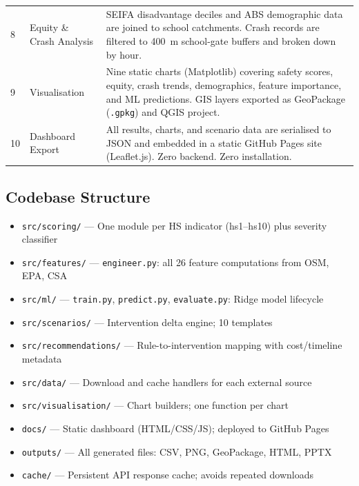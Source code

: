 \documentclass[11pt,a4paper]{article}
\begin{document}
\begin{tabularx}{\linewidth}{C{0.5cm} L{3.2cm} L{9.5cm}}
8 & Equity \& Crash Analysis & SEIFA disadvantage deciles and ABS demographic data are joined to school catchments. Crash records are filtered to 400~m school-gate buffers and broken down by hour. \\
9 & Visualisation       & Nine static charts (Matplotlib) covering safety scores, equity, crash trends, demographics, feature importance, and ML predictions. GIS layers exported as GeoPackage (\texttt{.gpkg}) and QGIS project. \\
10 & Dashboard Export   & All results, charts, and scenario data are serialised to JSON and embedded in a static GitHub Pages site (Leaflet.js). Zero backend. Zero installation. \\
\bottomrule
\end{tabularx}

\vspace{6pt}

\subsection{Codebase Structure}

\begin{multicols}{2}
\begin{itemize}
  \item \texttt{src/scoring/} --- One module per HS indicator (hs1--hs10) plus severity classifier
  \item \texttt{src/features/} --- \texttt{engineer.py}: all 26 feature computations from OSM, EPA, CSA
  \item \texttt{src/ml/} --- \texttt{train.py}, \texttt{predict.py}, \texttt{evaluate.py}: Ridge model lifecycle
  \item \texttt{src/scenarios/} --- Intervention delta engine; 10 templates
  \item \texttt{src/recommendations/} --- Rule-to-intervention mapping with cost/timeline metadata
  \item \texttt{src/data/} --- Download and cache handlers for each external source
  \item \texttt{src/visualisation/} --- Chart builders; one function per chart
  \item \texttt{docs/} --- Static dashboard (HTML/CSS/JS); deployed to GitHub Pages
  \item \texttt{outputs/} --- All generated files: CSV, PNG, GeoPackage, HTML, PPTX
  \item \texttt{cache/} --- Persistent API response cache; avoids repeated downloads
\end{itemize}
\end{multicols}
\end{document}
